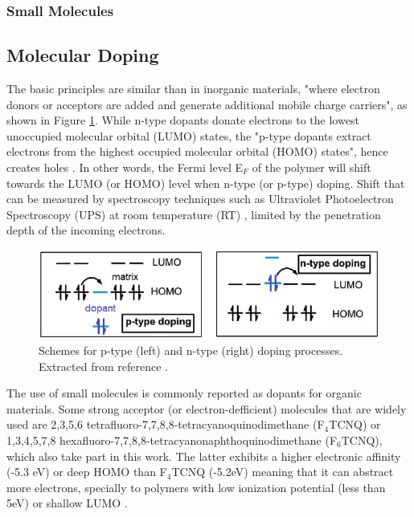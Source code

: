 
\subsubsection{Small Molecules}

\subsection{Molecular Doping} \label{subsec:moldop}
The basic principles are similar than in inorganic materials, "where electron donors or acceptors are added and generate additional mobile charge carriers", as shown in Figure \ref{fig:doping}. While n-type dopants donate electrons to the lowest unoccupied molecular orbital (LUMO) states, the "p-type dopants extract electrons from the highest occupied molecular orbital (HOMO) states", hence creates holes \cite{lussemDopingOrganicSemiconductors2013}. In other words, the Fermi level E$_{F}$ of the polymer will shift towards the LUMO (or HOMO) level when n-type (or p-type) doping. Shift that can be measured by spectroscopy techniques such as Ultraviolet Photoelectron Spectroscopy (UPS) at room temperature (RT) \cite{tietzeFermiLevelShift2012}, limited by the penetration depth of the incoming electrons.

\begin{figure}[h]
  \centering
  \includegraphics[width=12cm]{Images/doping.jpg}
  \caption{Schemes for p-type (left) and n-type (right) doping processes. Extracted from reference \cite{lussemDopingOrganicSemiconductors2013}.}
  \label{fig:doping}
\end{figure}

The use of small molecules is commonly reported as dopants for organic materials. Some strong acceptor (or electron-defficient) molecules that are widely used are 2,3,5,6 tetrafluoro-7,7,8,8-tetracyanoquinodimethane (F$_{4}$TCNQ) or 1,3,4,5,7,8 hexafluoro-7,7,8,8-tetracyanonaphthoquinodimethane (F$_{6}$TCNQ), which also take part in this work. The latter exhibits a higher electronic affinity (-5.3 eV) or deep HOMO than F$_{4}$TCNQ (-5.2eV) meaning that it can abstract more electrons, specially to polymers with low ionization potential (less than 5eV) or shallow LUMO \cite{kieferDoubleDopingConjugated2019}%
.

